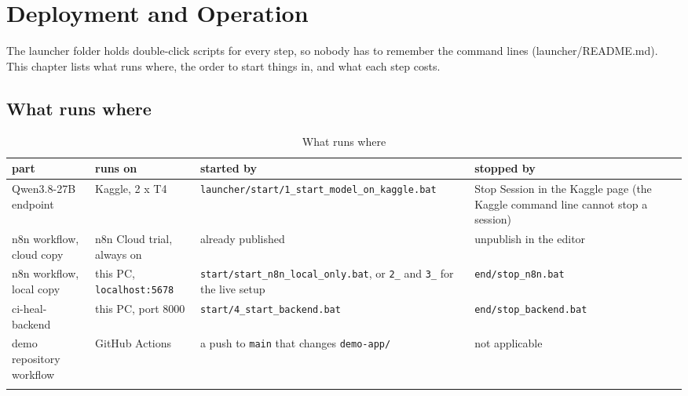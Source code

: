 \section{Deployment and Operation}

The launcher folder holds double-click scripts for every step, so nobody has to remember the command lines (launcher/\allowbreak{}README.md). This chapter lists what runs where, the order to start things in, and what each step costs.

\subsection{What runs where}

\begingroup\small
\begin{longtable}{>{\raggedright\arraybackslash}p{0.163\dimexpr\linewidth-8\tabcolsep\relax}>{\raggedright\arraybackslash}p{0.153\dimexpr\linewidth-8\tabcolsep\relax}>{\raggedright\arraybackslash}p{0.432\dimexpr\linewidth-8\tabcolsep\relax}>{\raggedright\arraybackslash}p{0.253\dimexpr\linewidth-8\tabcolsep\relax}}
\toprule
\rowcolor{gray!14}\textbf{part} & \textbf{runs on} & \textbf{started by} & \textbf{stopped by} \\
\midrule
\endhead
\bottomrule
\endfoot
\endlastfoot
Qwen3.8-27B endpoint & Kaggle, 2 x T4 & \texttt{launcher/\allowbreak{}start/\allowbreak{}1\_\allowbreak{}start\_\allowbreak{}model\_\allowbreak{}on\_\allowbreak{}kaggle.\allowbreak{}bat} & Stop Session in the Kaggle page (the Kaggle command line cannot stop a session) \\
n8n workflow, cloud copy & n8n Cloud trial, always on & already published & unpublish in the editor \\
n8n workflow, local copy & this PC, \texttt{localhost:\allowbreak{}5678} & \texttt{start/\allowbreak{}start\_\allowbreak{}n8n\_\allowbreak{}local\_\allowbreak{}only.\allowbreak{}bat}, or \texttt{2\_\allowbreak{}} and \texttt{3\_\allowbreak{}} for the live setup & \texttt{end/\allowbreak{}stop\_\allowbreak{}n8n.\allowbreak{}bat} \\
ci-heal-backend & this PC, port 8000 & \texttt{start/\allowbreak{}4\_\allowbreak{}start\_\allowbreak{}backend.\allowbreak{}bat} & \texttt{end/\allowbreak{}stop\_\allowbreak{}backend.\allowbreak{}bat} \\
demo repository workflow & GitHub Actions & a push to \texttt{main} that changes \texttt{demo-\allowbreak{}app/\allowbreak{}} & not applicable \\
\bottomrule
\caption{What runs where}\label{tab:10deploy-1}\\
\end{longtable}
\endgroup

